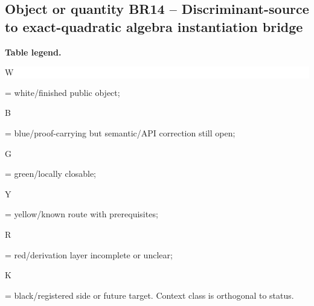 \subsection*{Object or quantity BR14 -- Discriminant-source to exact-quadratic algebra instantiation bridge}
\hypertarget{objproof:BR14}{}
\par\smallskip\noindent\begin{minipage}{0.99\linewidth}\footnotesize\raggedright\textbf{Table legend.} \colorbox{white}{\strut W} = white/finished public object; \colorbox{cyan!20}{\strut B} = blue/proof-carrying but semantic/API correction still open; \colorbox{green!18}{\strut G} = green/locally closable; \colorbox{yellow!25}{\strut Y} = yellow/known route with prerequisites; \colorbox{red!20}{\strut R} = red/derivation layer incomplete or unclear; \colorbox{black!18}{\strut K} = black/registered side or future target. Context class is orthogonal to status.\end{minipage}\par\vspace{0.25em}
